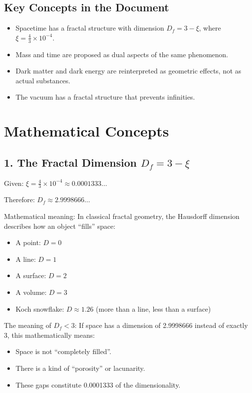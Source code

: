 \documentclass[12pt,a4paper]{article}
\begin{document}
	\subsection{Key Concepts in the Document}
	\begin{itemize}
		\item Spacetime has a fractal structure with dimension \( D_f = 3 - \xi \), where \( \xi = \frac{4}{3} \times 10^{-4} \).
		\item Mass and time are proposed as dual aspects of the same phenomenon.
		\item Dark matter and dark energy are reinterpreted as geometric effects, not as actual substances.
		\item The vacuum has a fractal structure that prevents infinities.
	\end{itemize}
	
	\section{Mathematical Concepts}
	
	\subsection{1. The Fractal Dimension \( D_f = 3 - \xi \)}
	Given: \( \xi = \frac{4}{3} \times 10^{-4} \approx 0.0001333\ldots \)
	
	Therefore: \( D_f \approx 2.9998666\ldots \)
	
	Mathematical meaning:
	In classical fractal geometry, the Hausdorff dimension describes how an object ``fills'' space:
	\begin{itemize}
		\item A point: \( D = 0 \)
		\item A line: \( D = 1 \)
		\item A surface: \( D = 2 \)
		\item A volume: \( D = 3 \)
		\item Koch snowflake: \( D \approx 1.26 \) (more than a line, less than a surface)
	\end{itemize}
	
	The meaning of \( D_f < 3 \):
	If space has a dimension of 2.9998666 instead of exactly 3, this mathematically means:
	\begin{itemize}
		\item Space is not ``completely filled''.
		\item There is a kind of ``porosity'' or lacunarity.
		\item These gaps constitute 0.0001333 of the dimensionality.
	\end{itemize}
	
\end{document}
